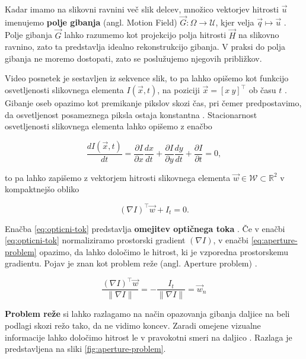 Kadar imamo na slikovni ravnini več slik delcev, množico vektorjev hitrosti $\vec{u}$ imenujemo \textbf{polje gibanja} (angl. Motion Field) $\vec{G} : \mathit{\Omega} \to \mathcal{U}$, kjer velja $ \vec{q} \mapsto \vec{u}$ \cite{trucco1998introductory}. Polje gibanja $\vec{G}$ lahko razumemo kot projekcijo polja hitrosti $\vec{H}$ na slikovno ravnino, zato ta predstavlja idealno rekonstrukcijo gibanja. V praksi do polja gibanja ne moremo dostopati, zato se poslužujemo njegovih približkov.  

Video posnetek je sestavljen iz sekvence slik, to pa lahko opišemo kot funkcijo osvetljenosti slikovnega elementa $I(\vec{x},t)$, na poziciji $\vec{x} = [x~y]^\top$ ob času $t$ \cite{wedel2011stereo}. Gibanje oseb opazimo kot premikanje pikslov skozi čas, pri čemer predpostavimo, da osvetljenost posameznega piksla ostaja konstantna \cite{trucco1998introductory}. Stacionarnost osvetljenosti slikovnega elementa lahko opišemo z enačbo  

\begin{equation}
	\frac{d I(\vec{x}, t)}{dt} = \frac{\partial I}{\partial x} \frac{dx}{dt} + \frac{\partial I}{\partial y} \frac{dy}{dt} + \frac{\partial I}{\partial t} = 0,
\end{equation}

to pa lahko zapišemo z vektorjem hitrosti slikovnega elementa $\vec{w} \in \mathcal{W} \subset \mathbb{R}^2$ v kompaktnejšo obliko

\begin{equation}\label{eq:opticni-tok}
	(\nabla I)^\top \vec{w} + I_t = 0.
\end{equation}

Enačba \eqref{eq:opticni-tok} predstavlja \textbf{omejitev optičnega toka} \cite{trucco1998introductory}. Če v enačbi \eqref{eq:opticni-tok} normaliziramo prostorski gradient $(\nabla I)$, v enačbi \eqref{eq:aperture-problem} opazimo, da lahko  določimo le hitrost, ki je vzporedna prostorskemu gradientu. Pojav je znan kot problem reže (angl. Aperture problem) \cite{trucco1998introductory}. 

\begin{equation}\label{eq:aperture-problem}
	\frac{(\nabla I)^\top \vec{w}}{\| \nabla I \|} = - \frac{I_t}{\| \nabla I \|} = \vec{w}_n
\end{equation}

\textbf{Problem reže} si lahko razlagamo na način opazovanja gibanja daljice na beli podlagi skozi režo tako, da ne vidimo koncev. Zaradi omejene vizualne informacije lahko določimo hitrost le v pravokotni smeri na daljico \cite{trucco1998introductory}. Razlaga je predstavljena na sliki \ref{fig:aperture-problem}.




